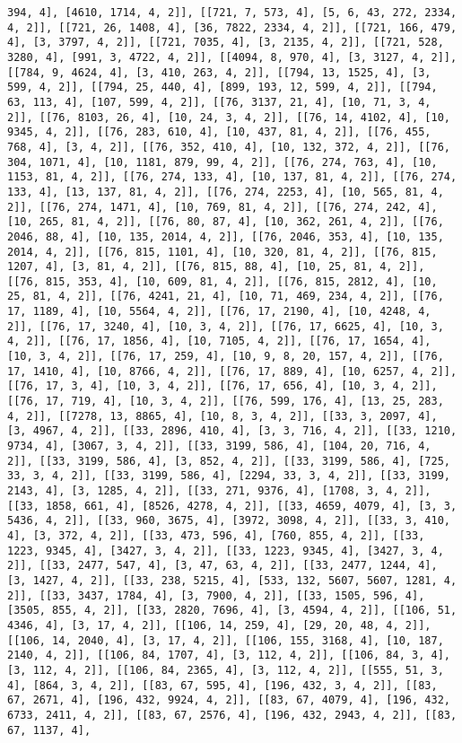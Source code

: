 \documentclass[12pt,fleqn]{article}\usepackage{../../common}
\begin{document}
\begin{verbatim}
394, 4], [4610, 1714, 4, 2]], [[721, 7, 573, 4], [5, 6, 43, 272, 2334, 4, 2]], [[721, 26, 1408, 4], [36, 7822, 2334, 4, 2]], [[721, 166, 479, 4], [3, 3797, 4, 2]], [[721, 7035, 4], [3, 2135, 4, 2]], [[721, 528, 3280, 4], [991, 3, 4722, 4, 2]], [[4094, 8, 970, 4], [3, 3127, 4, 2]], [[784, 9, 4624, 4], [3, 410, 263, 4, 2]], [[794, 13, 1525, 4], [3, 599, 4, 2]], [[794, 25, 440, 4], [899, 193, 12, 599, 4, 2]], [[794, 63, 113, 4], [107, 599, 4, 2]], [[76, 3137, 21, 4], [10, 71, 3, 4, 2]], [[76, 8103, 26, 4], [10, 24, 3, 4, 2]], [[76, 14, 4102, 4], [10, 9345, 4, 2]], [[76, 283, 610, 4], [10, 437, 81, 4, 2]], [[76, 455, 768, 4], [3, 4, 2]], [[76, 352, 410, 4], [10, 132, 372, 4, 2]], [[76, 304, 1071, 4], [10, 1181, 879, 99, 4, 2]], [[76, 274, 763, 4], [10, 1153, 81, 4, 2]], [[76, 274, 133, 4], [10, 137, 81, 4, 2]], [[76, 274, 133, 4], [13, 137, 81, 4, 2]], [[76, 274, 2253, 4], [10, 565, 81, 4, 2]], [[76, 274, 1471, 4], [10, 769, 81, 4, 2]], [[76, 274, 242, 4], [10, 265, 81, 4, 2]], [[76, 80, 87, 4], [10, 362, 261, 4, 2]], [[76, 2046, 88, 4], [10, 135, 2014, 4, 2]], [[76, 2046, 353, 4], [10, 135, 2014, 4, 2]], [[76, 815, 1101, 4], [10, 320, 81, 4, 2]], [[76, 815, 1207, 4], [3, 81, 4, 2]], [[76, 815, 88, 4], [10, 25, 81, 4, 2]], [[76, 815, 353, 4], [10, 609, 81, 4, 2]], [[76, 815, 2812, 4], [10, 25, 81, 4, 2]], [[76, 4241, 21, 4], [10, 71, 469, 234, 4, 2]], [[76, 17, 1189, 4], [10, 5564, 4, 2]], [[76, 17, 2190, 4], [10, 4248, 4, 2]], [[76, 17, 3240, 4], [10, 3, 4, 2]], [[76, 17, 6625, 4], [10, 3, 4, 2]], [[76, 17, 1856, 4], [10, 7105, 4, 2]], [[76, 17, 1654, 4], [10, 3, 4, 2]], [[76, 17, 259, 4], [10, 9, 8, 20, 157, 4, 2]], [[76, 17, 1410, 4], [10, 8766, 4, 2]], [[76, 17, 889, 4], [10, 6257, 4, 2]], [[76, 17, 3, 4], [10, 3, 4, 2]], [[76, 17, 656, 4], [10, 3, 4, 2]], [[76, 17, 719, 4], [10, 3, 4, 2]], [[76, 599, 176, 4], [13, 25, 283, 4, 2]], [[7278, 13, 8865, 4], [10, 8, 3, 4, 2]], [[33, 3, 2097, 4], [3, 4967, 4, 2]], [[33, 2896, 410, 4], [3, 3, 716, 4, 2]], [[33, 1210, 9734, 4], [3067, 3, 4, 2]], [[33, 3199, 586, 4], [104, 20, 716, 4, 2]], [[33, 3199, 586, 4], [3, 852, 4, 2]], [[33, 3199, 586, 4], [725, 33, 3, 4, 2]], [[33, 3199, 586, 4], [2294, 33, 3, 4, 2]], [[33, 3199, 2143, 4], [3, 1285, 4, 2]], [[33, 271, 9376, 4], [1708, 3, 4, 2]], [[33, 1858, 661, 4], [8526, 4278, 4, 2]], [[33, 4659, 4079, 4], [3, 3, 5436, 4, 2]], [[33, 960, 3675, 4], [3972, 3098, 4, 2]], [[33, 3, 410, 4], [3, 372, 4, 2]], [[33, 473, 596, 4], [760, 855, 4, 2]], [[33, 1223, 9345, 4], [3427, 3, 4, 2]], [[33, 1223, 9345, 4], [3427, 3, 4, 2]], [[33, 2477, 547, 4], [3, 47, 63, 4, 2]], [[33, 2477, 1244, 4], [3, 1427, 4, 2]], [[33, 238, 5215, 4], [533, 132, 5607, 5607, 1281, 4, 2]], [[33, 3437, 1784, 4], [3, 7900, 4, 2]], [[33, 1505, 596, 4], [3505, 855, 4, 2]], [[33, 2820, 7696, 4], [3, 4594, 4, 2]], [[106, 51, 4346, 4], [3, 17, 4, 2]], [[106, 14, 259, 4], [29, 20, 48, 4, 2]], [[106, 14, 2040, 4], [3, 17, 4, 2]], [[106, 155, 3168, 4], [10, 187, 2140, 4, 2]], [[106, 84, 1707, 4], [3, 112, 4, 2]], [[106, 84, 3, 4], [3, 112, 4, 2]], [[106, 84, 2365, 4], [3, 112, 4, 2]], [[555, 51, 3, 4], [864, 3, 4, 2]], [[83, 67, 595, 4], [196, 432, 3, 4, 2]], [[83, 67, 2671, 4], [196, 432, 9924, 4, 2]], [[83, 67, 4079, 4], [196, 432, 6733, 2411, 4, 2]], [[83, 67, 2576, 4], [196, 432, 2943, 4, 2]], [[83, 67, 1137, 4], 
\end{verbatim}
\end{document}
